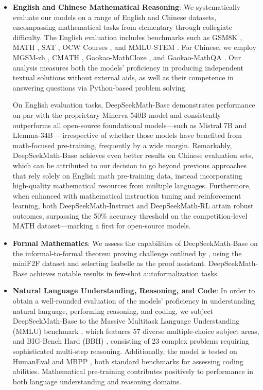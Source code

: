 \begin{itemize}[topsep=0pt]
    \item \textbf{English and Chinese Mathematical Reasoning}: We systematically evaluate our models on a range of English and Chinese datasets, encompassing mathematical tasks from elementary through collegiate difficulty. The English evaluation includes benchmarks such as GSM8K \citep{gsm8k}, MATH \citep{MATH}, SAT \citep{llemma}, OCW Courses \citep{minerva}, and MMLU-STEM \citep{mmlu}. For Chinese, we employ MGSM-zh \citep{mgsm}, CMATH \citep{wei2023cmath}, Gaokao-MathCloze \citep{agieval}, and Gaokao-MathQA \citep{agieval}. Our analysis measures both the models’ proficiency in producing independent textual solutions without external aids, as well as their competence in answering questions via Python-based problem solving.

On English evaluation tasks, DeepSeekMath-Base demonstrates performance on par with the proprietary Minerva 540B model \citep{minerva} and consistently outperforms all open-source foundational models—such as Mistral 7B \citep{mistral} and Llemma-34B \citep{llemma}—irrespective of whether those models have benefited from math-focused pre-training, frequently by a wide margin. Remarkably, DeepSeekMath-Base achieves even better results on Chinese evaluation sets, which can be attributed to our decision to go beyond previous approaches \citep{minerva,llemma} that rely solely on English math pre-training data, instead incorporating high-quality mathematical resources from multiple languages. Furthermore, when enhanced with mathematical instruction tuning and reinforcement learning, both DeepSeekMath-Instruct and DeepSeekMath-RL attain robust outcomes, surpassing the 50\% accuracy threshold on the competition-level MATH dataset—marking a first for open-source models.

\item \textbf{Formal Mathematics}: We assess the capabilities of DeepSeekMath-Base on the informal-to-formal theorem proving challenge outlined by \citep{dsp_proof}, using the miniF2F dataset \citep{minif2f} and selecting Isabelle \citep{isabelle} as the proof assistant. DeepSeekMath-Base achieves notable results in few-shot autoformalization tasks.
\item \textbf{Natural Language Understanding, Reasoning, and Code}: In order to obtain a well-rounded evaluation of the models’ proficiency in understanding natural language, performing reasoning, and coding, we subject DeepSeekMath-Base to the Massive Multitask Language Understanding (MMLU) benchmark \citep{mmlu}, which features 57 diverse multiple-choice subject areas, and BIG-Bench Hard (BBH) \citep{bbh}, consisting of 23 complex problems requiring sophisticated multi-step reasoning. Additionally, the model is tested on HumanEval \citep{codex} and MBPP \citep{mbpp}, both standard benchmarks for assessing coding abilities. Mathematical pre-training contributes positively to performance in both language understanding and reasoning domains.
\end{itemize}

